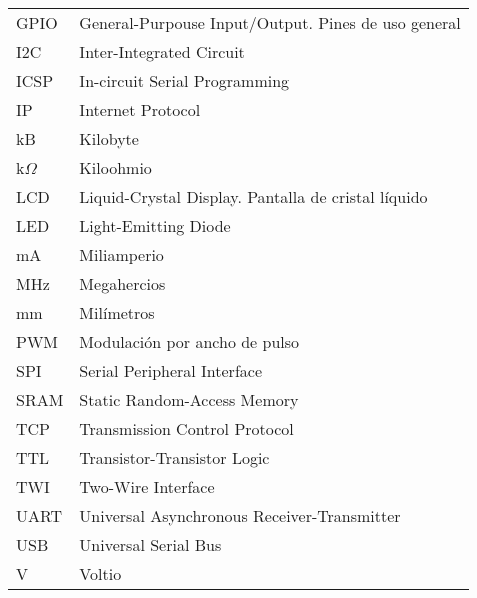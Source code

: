 \begin{longtable}{p{3cm}p{8.5cm}}
GPIO & General-Purpouse Input/Output. Pines de uso general \\
I2C & Inter-Integrated Circuit \\
ICSP & In-circuit Serial Programming \\
IP & Internet Protocol \\
kB & Kilobyte \\
k$\Omega$ & Kiloohmio \\
LCD & Liquid-Crystal Display. Pantalla de cristal líquido \\
LED & Light-Emitting Diode \\
mA & Miliamperio \\
MHz & Megahercios \\
mm & Milímetros \\
PWM & Modulación por ancho de pulso \\
SPI & Serial Peripheral Interface \\
SRAM & Static Random-Access Memory \\
TCP & Transmission Control Protocol \\
TTL & Transistor-Transistor Logic\\
TWI & Two-Wire Interface \\
UART & Universal Asynchronous Receiver-Transmitter \\
USB & Universal Serial Bus \\
V & Voltio \\



\end{longtable}
\newpage
%




